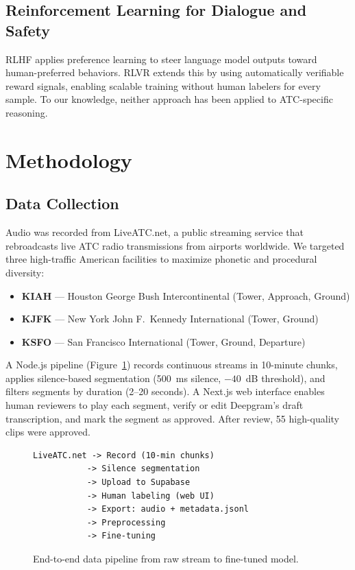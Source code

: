 \documentclass[11pt,a4paper]{article}
\begin{document}
\subsection{Reinforcement Learning for Dialogue and Safety}

RLHF \cite{ouyang2022rlhf} applies preference learning to steer language model
outputs toward human-preferred behaviors.
RLVR \cite{lightman2023rlvr, guo2025deepseekr1} extends this by using
automatically verifiable reward signals, enabling scalable training without
human labelers for every sample.
To our knowledge, neither approach has been applied to ATC-specific reasoning.

\section{Methodology}
\label{sec:method}

\subsection{Data Collection}

Audio was recorded from LiveATC.net, a public streaming service that
rebroadcasts live ATC radio transmissions from airports worldwide.
We targeted three high-traffic American facilities to maximize phonetic and
procedural diversity:
\begin{itemize}[noitemsep]
  \item \textbf{KIAH} --- Houston George Bush Intercontinental (Tower, Approach, Ground)
  \item \textbf{KJFK} --- New York John F.\ Kennedy International (Tower, Ground)
  \item \textbf{KSFO} --- San Francisco International (Tower, Ground, Departure)
\end{itemize}

A Node.js pipeline (Figure~\ref{fig:pipeline}) records continuous streams in
10-minute chunks, applies silence-based segmentation (500~ms silence,
$-40$~dB threshold), and filters segments by duration
(2--20 seconds).
A Next.js web interface enables human reviewers to play each segment, verify
or edit Deepgram's draft transcription, and mark the segment as approved.
After review, 55 high-quality clips were approved.

\begin{figure}[h]
\centering
\begin{verbatim}
LiveATC.net -> Record (10-min chunks)
           -> Silence segmentation
           -> Upload to Supabase
           -> Human labeling (web UI)
           -> Export: audio + metadata.jsonl
           -> Preprocessing
           -> Fine-tuning
\end{verbatim}
\caption{End-to-end data pipeline from raw stream to fine-tuned model.}
\label{fig:pipeline}
\end{figure}
\end{document}
